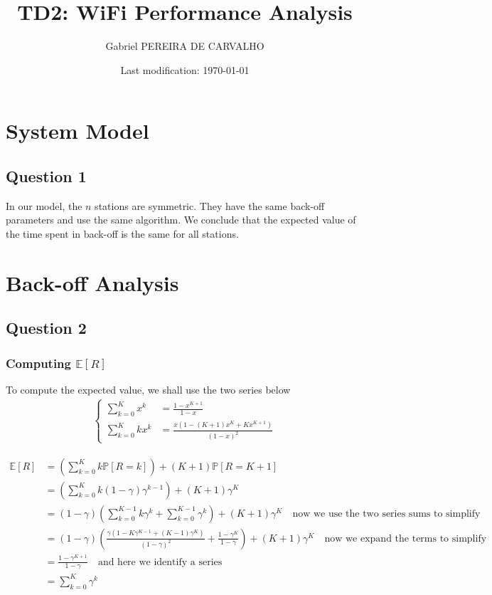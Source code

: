 \documentclass[]{article}
\title{TD2: WiFi Performance Analysis}
\author{Gabriel PEREIRA DE CARVALHO}
\date{Last modification: \today}
\begin{document}
	
	\maketitle
	
	\section{System Model}
	
	\subsection*{Question 1}
	
	In our model, the $n$ stations are symmetric. They have the same back-off parameters and use the same algorithm. We conclude that the expected value of the time spent in back-off is the same for all stations.
	
	\section{Back-off Analysis}
	
	\subsection*{Question 2}
	
	\subsubsection*{Computing $\mathbb{E}[R]$}
	
	\begin{tcolorbox}
		To compute the expected value, we shall use the two series below
		\begin{align}
			\begin{cases}
				\sum_{k=0}^{K} x^k &= \frac{1 - x^{K+1}}{1 - x} \\
				\sum_{k=0}^{K} k x^k &= \frac{x(1 - (K+1)x^K + Kx^{K+1})}{(1 - x)^2}
			\end{cases}
		\end{align}
	\end{tcolorbox}
	
	\begin{align}
		\mathbb{E}[R] &= \left(\sum_{k=0}^{K} k\mathbb{P}[R = k]\right) + (K+1)\mathbb{P}[R=K+1] \\
		&= \left(\sum_{k=0}^{K} k(1-\gamma)\gamma^{k-1}\right) + (K+1)\gamma^K \\
		&= (1-\gamma)\left(\sum_{k=0}^{K-1} k\gamma^{k} + \sum_{k=0}^{K-1} \gamma^{k}\right) + (K+1)\gamma^K \quad \text{now we use the two series sums to simplify} \\
		&= (1 - \gamma)\left(\frac{\gamma(1 - K\gamma^{K-1} + (K-1)\gamma^K)}{(1 - \gamma)^2} + \frac{1 - \gamma^K}{1 - \gamma}\right) + (K+1)\gamma^K \quad \text{now we expand the terms to simplify} \\
		&= \frac{1 - \gamma^{K+1}}{1-\gamma} \quad \text{and here we identify a series} \\
		&= \sum_{k=0}^{K} \gamma^k
	\end{align}
	
\end{document}
